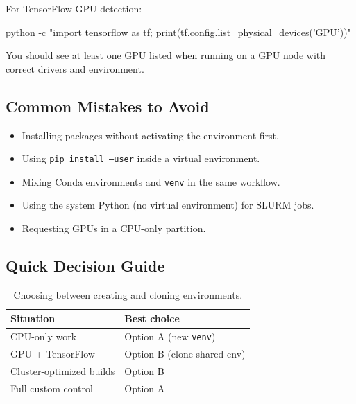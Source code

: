 \documentclass[11pt]{article}
\begin{document}
For TensorFlow GPU detection:\\
\begin{codeblock}
python -c "import tensorflow as tf; print(tf.config.list_physical_devices('GPU'))"
\end{codeblock}

You should see at least one GPU listed when running on a GPU node with correct drivers and environment.

\subsection{Common Mistakes to Avoid}

\begin{itemize}
  \item Installing packages without activating the environment first.
  \item Using \texttt{pip install --user} inside a virtual environment.
  \item Mixing Conda environments and \texttt{venv} in the same workflow.
  \item Using the system Python (no virtual environment) for SLURM jobs.
  \item Requesting GPUs in a CPU-only partition.
\end{itemize}

\subsection{Quick Decision Guide}

\begin{table}[ht]
\centering
\begin{tabular}{@{}ll@{}}
\toprule
Situation                & Best choice         \\
\midrule
CPU-only work            & Option A (new \texttt{venv}) \\
GPU + TensorFlow         & Option B (clone shared env)  \\
Cluster-optimized builds & Option B                     \\
Full custom control      & Option A                     \\
\bottomrule
\end{tabular}
\caption{Choosing between creating and cloning environments.}
\label{tab:decision-guide}
\end{table}
\end{document}
